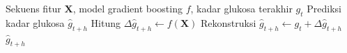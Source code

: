 \begin{algorithm}[h]
    \caption{Prediksi $\Delta$Glukosa dan Rekonstruksi Kadar Glukosa}
    \label{alg:alg5.2_prediksi_delta_glukosa}
    \begin{algorithmic}[1]
        \Require Sekuens fitur $\mathbf{X}$, model gradient boosting $f$, kadar glukosa terakhir $g_t$
        \Ensure Prediksi kadar glukosa $\hat{g}_{t+h}$
        \State Hitung $\Delta\hat{g}_{t+h} \gets f(\mathbf{X})$
        \State Rekonstruksi $\hat{g}_{t+h} \gets g_t + \Delta\hat{g}_{t+h}$
        \State \Return $\hat{g}_{t+h}$
    \end{algorithmic}
\end{algorithm}
